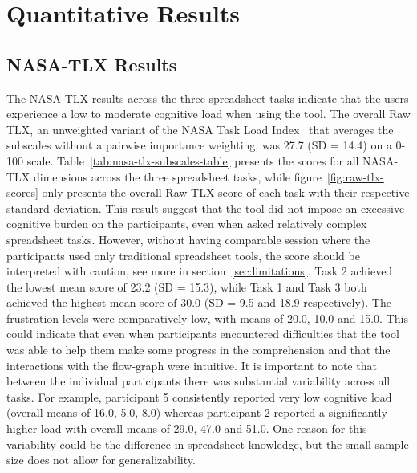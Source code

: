 \section{Quantitative Results}
\subsection{NASA-TLX Results}


The NASA-TLX results across the three spreadsheet tasks indicate that the users experience a low to moderate cognitive load when using the tool. The overall Raw TLX, an unweighted variant of the NASA Task Load Index~\cite{hart2006nasa} that averages the subscales without a pairwise importance weighting, was 27.7 (SD = 14.4) on a 0-100 scale. Table~\ref{tab:nasa-tlx-subscales-table} presents the scores for all NASA-TLX dimensions across the three spreadsheet tasks, while figure~\ref{fig:raw-tlx-scores} only presents the overall Raw TLX score of each task with their respective standard deviation. This result suggest that the tool did not impose an excessive cognitive burden on the participants, even when asked relatively complex spreadsheet tasks. However, without having comparable session where the participants used only traditional spreadsheet tools, the score should be interpreted with caution, see more in section~\ref{sec:limitations}. Task 2 achieved the lowest mean score of 23.2 (SD = 15.3), while Task 1 and Task 3 both achieved the highest mean score of 30.0 (SD = 9.5 and 18.9 respectively). The frustration levels were comparatively low, with means of 20.0, 10.0 and 15.0. This could indicate that even when participants encountered difficulties that the tool was able to help them make some progress in the comprehension and that the interactions with the flow-graph were intuitive. 
It is important to note that between the individual participants there was substantial variability across all tasks. For example, participant 5 consistently reported very low cognitive load (overall means of 16.0, 5.0, 8.0) whereas participant 2 reported a significantly higher load with overall means of 29.0, 47.0 and 51.0. One reason for this variability could be the difference in spreadsheet knowledge, but the small sample size does not allow for generalizability.


